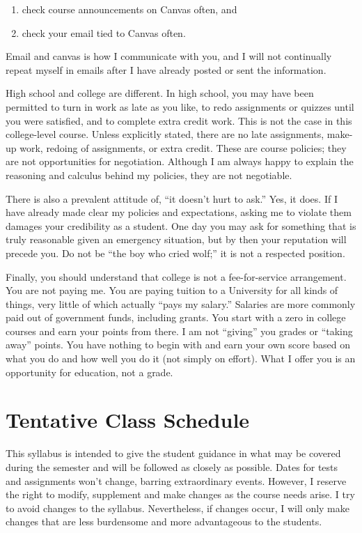 \documentclass[11pt,]{article}
\providecommand{\tightlist}{%
  \setlength{\itemsep}{0pt}\setlength{\parskip}{0pt}}
\begin{document}
\begin{enumerate}
\def\labelenumi{\arabic{enumi}.}
\tightlist
\item
  check course announcements on Canvas often, and
\item
  check your email tied to Canvas often.
\end{enumerate}

Email and canvas is how I communicate with you, and I will not
continually repeat myself in emails after I have already posted or sent
the information.

High school and college are different. In high school, you may have been
permitted to turn in work as late as you like, to redo assignments or
quizzes until you were satisfied, and to complete extra credit work.
This is not the case in this college-level course. Unless explicitly
stated, there are no late assignments, make-up work, redoing of
assignments, or extra credit. These are course policies; they are not
opportunities for negotiation. Although I am always happy to explain the
reasoning and calculus behind my policies, they are not negotiable.

There is also a prevalent attitude of, ``it doesn't hurt to ask.'' Yes,
it does. If I have already made clear my policies and expectations,
asking me to violate them damages your credibility as a student. One day
you may ask for something that is truly reasonable given an emergency
situation, but by then your reputation will precede you. Do not be ``the
boy who cried wolf;'' it is not a respected position.

Finally, you should understand that college is not a fee-for-service
arrangement. You are not paying me. You are paying tuition to a
University for all kinds of things, very little of which actually ``pays
my salary.'' Salaries are more commonly paid out of government funds,
including grants. You start with a zero in college courses and earn your
points from there. I am not ``giving'' you grades or ``taking away''
points. You have nothing to begin with and earn your own score based on
what you do and how well you do it (not simply on effort). What I offer
you is an opportunity for education, not a grade.

\hypertarget{tentative-class-schedule}{%
\section{Tentative Class Schedule}\label{tentative-class-schedule}}

This syllabus is intended to give the student guidance in what may be
covered during the semester and will be followed as closely as possible.
Dates for tests and assignments won't change, barring extraordinary
events. However, I reserve the right to modify, supplement and make
changes as the course needs arise. I try to avoid changes to the
syllabus. Nevertheless, if changes occur, I will only make changes that
are less burdensome and more advantageous to the students.
\end{document}
